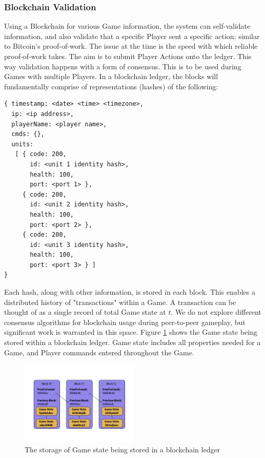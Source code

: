 \documentclass[10pt, titlepage, twocolumn]{article}
\newcommand{\ii}{\indent\indent}
\begin{document}
\subsubsection{Blockchain Validation}
\ii
Using a Blockchain for various Game information, the system can self-validate information, and also validate that a specific Player sent a specific action; similar to Bitcoin's proof-of-work. The issue at the time is the speed with which reliable proof-of-work takes. The aim is to submit Player Actions onto the ledger. This way validation happens with a form of consensus. This is to be used during Games with multiple Players. In a blockchain ledger, the blocks will fundamentally comprise of representations (hashes) of the following:

\begin{verbatim}
{ timestamp: <date> <time> <timezone>,
  ip: <ip address>,
  playerName: <player name>,
  cmds: {},
  units: 
   [ { code: 200,
       id: <unit 1 identity hash>,
       health: 100,
       port: <port 1> },
     { code: 200,
       id: <unit 2 identity hash>,
       health: 100,
       port: <port 2> },
     { code: 200,
       id: <unit 3 identity hash>,
       health: 100,
       port: <port 3> } ] 
}
\end{verbatim}

Each hash, along with other information, is stored in each block. This enables a distributed history of "transactions" within a Game. A transaction can be thought of as a single record of total Game state at \(t\). We do not explore different consensus algorithms for blockchain usage during peer-to-peer gameplay, but significant work is warranted in this space. Figure \ref{blockchainstructure} shows the Game state being stored within a blockchain ledger. Game state includes all properties needed for a Game, and Player commands entered throughout the Game.

\begin{figure}[ht]
	\centering
	\includegraphics[width=0.5\textwidth]{blockchainstructure}
	\caption{The storage of Game state being stored in a blockchain ledger}
	\label{blockchainstructure}
\end{figure}
\end{document}
